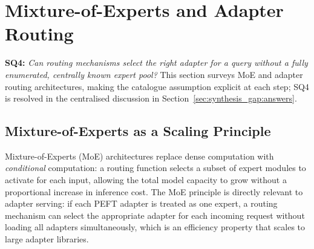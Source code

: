 \section{Mixture-of-Experts and Adapter Routing}
\label{sec:moe_routing}

\noindent\textbf{SQ4:} \textit{Can routing mechanisms select the right adapter
for a query without a fully enumerated, centrally known expert pool?} This
section surveys MoE and adapter routing architectures, making the catalogue
assumption explicit at each step; SQ4 is resolved in the centralised
discussion in Section~\ref{sec:synthesis_gap:answers}.

\subsection{Mixture-of-Experts as a Scaling Principle}
\label{sec:moe_routing:foundations}

Mixture-of-Experts (MoE) architectures \cite{ShazeerMoE2017} replace dense computation with \textit{conditional}
computation: a routing function selects a subset of expert modules to activate for each
input, allowing the total model capacity to grow without a proportional increase in
inference cost. The MoE principle is directly relevant to adapter serving: if each
PEFT adapter is treated as one expert, a routing mechanism can select the appropriate
adapter for each incoming request without loading all adapters simultaneously, which is an
efficiency property that scales to large adapter libraries.

